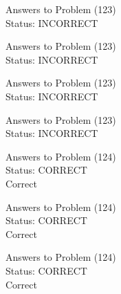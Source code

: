 \documentclass[11pt]{article}
\begin{document}
\begin{minipage}[t]{0.5\textwidth}
  {\centering
  
  Answers to Problem (123)\\
  Status: INCORRECT\\
  
  }
\end{minipage}
\begin{minipage}[t]{0.5\textwidth}
  {\centering
  
  Answers to Problem (123)\\
  Status: INCORRECT\\
  
  }
\end{minipage}
\begin{minipage}[t]{0.5\textwidth}
  {\centering
  
  Answers to Problem (123)\\
  Status: INCORRECT\\
  
  }
\end{minipage}
\begin{minipage}[t]{0.5\textwidth}
  {\centering
  
  Answers to Problem (123)\\
  Status: INCORRECT\\
  
  }
\end{minipage}
\begin{minipage}[t]{0.5\textwidth}
  {\centering
  
  Answers to Problem (124)\\
  Status: CORRECT\\
  Correct\\
  }
\end{minipage}
\begin{minipage}[t]{0.5\textwidth}
  {\centering
  
  Answers to Problem (124)\\
  Status: CORRECT\\
  Correct\\
  }
\end{minipage}
\begin{minipage}[t]{0.5\textwidth}
  {\centering
  
  Answers to Problem (124)\\
  Status: CORRECT\\
  Correct\\
  }
\end{minipage}
\end{document}
